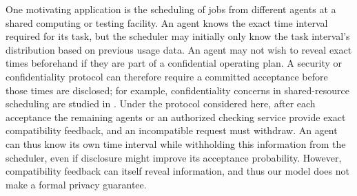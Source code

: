\documentclass{article}
\begin{document}
One motivating application is the scheduling of jobs from different agents at a shared computing or testing facility. An agent knows the exact time interval required for its task, but the scheduler may initially only know the task interval's distribution based on previous usage data. An agent may not wish to reveal exact times beforehand if they are part of a confidential operating plan. A security or confidentiality protocol can therefore require a committed acceptance before those times are disclosed; for example, confidentiality concerns in shared-resource scheduling are studied in \cite{SinghOKeefe2016}. Under the protocol considered here, after each acceptance the remaining agents or an authorized checking service provide exact compatibility feedback, and an incompatible request must withdraw.  
An agent can thus know its own time interval while withholding this information from the scheduler, even if disclosure might improve its acceptance probability. However, compatibility feedback can itself reveal information, and thus our model does not make a formal privacy guarantee. 
\end{document}
